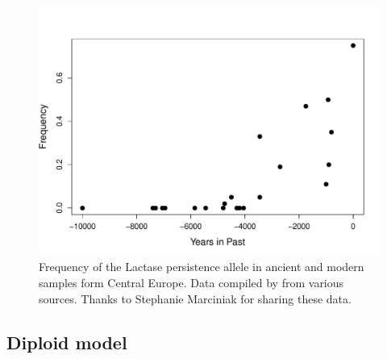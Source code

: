
\begin{figure}
\begin{center}
\includegraphics[width= \textwidth]{Rcode/Lactase_example/Lactase_freq_time.pdf}
\end{center}
\caption{Frequency of the Lactase persistence allele in ancient and
  modern samples form Central Europe. Data compiled by
  \citet{marciniak2017} from various sources. Thanks to Stephanie
  Marciniak for sharing these data. } \label{fig:LCT_freqs}
\end{figure}

\subsection{Diploid model}

